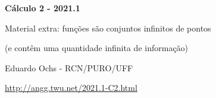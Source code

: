 \documentclass[oneside,12pt]{article}
\begin{document}


\long{}
\long{}
\long{}
\long{}
\long{}
\long{}
\long{}
\long{}
\long{}
\long{}
\long{}

\long{}
\long{}

\def\frown{\ensuremath{{=}{(}}}
\def\True {\mathbf{V}}
\def\False{\mathbf{F}}
\def\D    {\displaystyle}

\def\drafturl{http://angg.twu.net/LATEX/2021-1-C2.pdf}
\def\drafturl{http://angg.twu.net/2021.1-C2.html}
\def\draftfooter{\tiny \href{\drafturl}{\jobname{}} \ColorBrown{\shorttoday{} \hours}}



%

\thispagestyle{empty}

\begin{center}

\vspace*{1.2cm}

{\bf \Large Cálculo 2 - 2021.1}

\bsk

Material extra: funções são conjuntos infinitos de pontos

(e contêm uma quantidade infinita de informação)

\bsk

Eduardo Ochs - RCN/PURO/UFF

\url{http://angg.twu.net/2021.1-C2.html}

\end{center}
\end{document}

